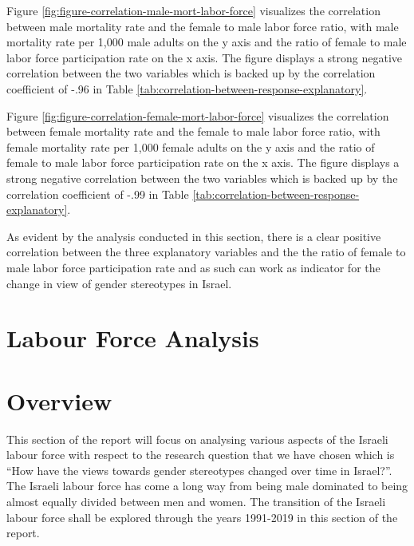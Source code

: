 \documentclass[11pt,a4paper,]{article}
\begin{document}
Figure \ref{fig:figure-correlation-male-mort-labor-force} visualizes the
correlation between male mortality rate and the female to male labor
force ratio, with male mortality rate per 1,000 male adults on the y
axis and the ratio of female to male labor force participation rate on
the x axis. The figure displays a strong negative correlation between
the two variables which is backed up by the correlation coefficient of
-.96 in Table \ref{tab:correlation-between-response-explanatory}.

Figure \ref{fig:figure-correlation-female-mort-labor-force} visualizes
the correlation between female mortality rate and the female to male
labor force ratio, with female mortality rate per 1,000 female adults on
the y axis and the ratio of female to male labor force participation
rate on the x axis. The figure displays a strong negative correlation
between the two variables which is backed up by the correlation
coefficient of -.99 in Table
\ref{tab:correlation-between-response-explanatory}.

As evident by the analysis conducted in this section, there is a clear
positive correlation between the three explanatory variables and the the
ratio of female to male labor force participation rate and as such can
work as indicator for the change in view of gender stereotypes in
Israel.

\section*{Labour Force Analysis}

\section{Overview}\label{overview}

This section of the report will focus on analysing various aspects of
the Israeli labour force with respect to the research question that we
have chosen which is ``How have the views towards gender stereotypes
changed over time in Israel?''. The Israeli labour force has come a long
way from being male dominated to being almost equally divided between
men and women. The transition of the Israeli labour force shall be
explored through the years 1991-2019 in this section of the report.
\end{document}
